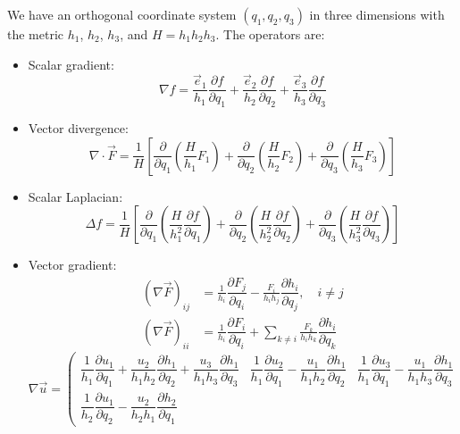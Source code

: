 \documentclass{article}
\numberwithin{equation}{section}
\newcommand{\pd}[2]{\dfrac{\partial #1}{\partial #2}}
\newcommand{\unitvec}[1]{\vec{e}_{#1}}
\begin{document}
We have an orthogonal coordinate system $(q_1, q_2, q_3)$ in three dimensions with the metric $h_1$, $h_2$, $h_3$, and $H = h_1h_2h_3$.
The operators are:
\begin{itemize}
    \item Scalar gradient:
    \begin{equation}
        \nabla f
        = \frac{\unitvec{1}}{h_1} \pd{f}{q_1}
        + \frac{\unitvec{2}}{h_2} \pd{f}{q_2}
        + \frac{\unitvec{3}}{h_3} \pd{f}{q_3}
    \end{equation}
    \item Vector divergence:
    \begin{equation}
        \nabla \cdot \vec{F} =
        \frac{1}{H} \left[
              \pd{}{q_1} \left(\frac{H}{h_1} F_1\right)
            + \pd{}{q_2} \left(\frac{H}{h_2} F_2\right)
            + \pd{}{q_3} \left(\frac{H}{h_3} F_3\right)
        \right]
    \end{equation}
    \item Scalar Laplacian:
    \begin{equation}
        \Delta f = 
        \frac{1}{H} \left[
              \pd{}{q_1} \left(\frac{H}{h_1^2} \pd{f}{q_1}\right)
            + \pd{}{q_2} \left(\frac{H}{h_2^2} \pd{f}{q_2}\right)
            + \pd{}{q_3} \left(\frac{H}{h_3^2} \pd{f}{q_3}\right)
        \right]
    \end{equation}
    \item Vector gradient:
    \begin{equation}
        \begin{split}
            \left(\nabla \vec{F}\right)_{ij} &=
            \frac{1}{h_i} \pd{F_j}{q_i} - \frac{F_i}{h_i h_j} \pd{h_i}{q_j}, \quad i \ne j \\
            \left(\nabla \vec{F}\right)_{ii} &=
            \frac{1}{h_i} \pd{F_i}{q_i} + \sum_{k \ne i} \frac{F_k}{h_i h_k} \pd{h_i}{q_k}
        \end{split}
    \end{equation}
    \begin{equation}
        \nabla \vec{u} = \left(\begin{matrix}
            \dfrac{1}{h_1} \pd{u_1}{q_1} +
            \dfrac{u_2}{h_1 h_2} \pd{h_1}{q_2} +
            \dfrac{u_3}{h_1 h_3} \pd{h_1}{q_3} & 
            \dfrac{1}{h_1} \pd{u_2}{q_1} - \dfrac{u_1}{h_1 h_2} \pd{h_1}{q_2} &
            \dfrac{1}{h_1} \pd{u_3}{q_1} - \dfrac{u_1}{h_1 h_3} \pd{h_1}{q_3} \\
            \dfrac{1}{h_2} \pd{u_1}{q_2} - \dfrac{u_2}{h_2 h_1} \pd{h_2}{q_1} &

\end{matrix}
\end{equation}
\end{itemize}
\end{document}
